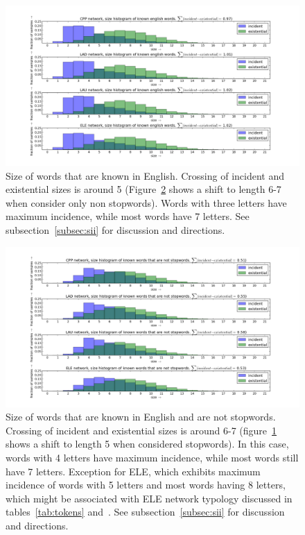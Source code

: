 \documentclass[%
 aip,
 jmp,%
 amsmath,amssymb,
 reprint,%
]{revtex4-1}
\begin{document}
\begin{figure}[h!]
    \centering
    \includegraphics[width=\textwidth]{figs/kw}
    \caption{Size of words that are known in English. Crossing of incident and existential sizes is around 5 (Figure~\ref{fig:kwnsw} shows a shift to length 6-7 when consider only non stopwords). Words with three letters have maximum incidence, while most words have 7 letters. See subsection~\ref{subsec:sii} for discussion and directions.}
    \label{fig:kw}
\end{figure}


\begin{figure}[h!]
    \centering
    \includegraphics[width=\textwidth]{figs/kwnsw}
    \caption{Size of words that are known in English and are not stopwords. Crossing of incident and existential sizes is around 6-7 (figure~\ref{fig:kw} shows a shift to length 5 when considered stopwords). In this case, words with 4 letters have maximum incidence, while most words still have 7 letters. Exception for ELE, which exhibits maximum incidence of words with 5 letters and most words having 8 letters, which might be associated with ELE network typology discussed in tables~\ref{tab:tokens} and~\label{tab:caracteres}. See subsection~\ref{subsec:sii} for discussion and directions.}
    \label{fig:kwnsw}
\end{figure}
\end{document}
